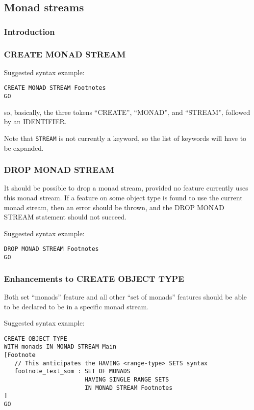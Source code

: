 \documentclass[a4paper,12pt]{article}
\begin{document}
\subsection{Monad streams}\label{sec:MonadStreams}

\subsubsection{Introduction}

\subsubsection{CREATE MONAD STREAM}

Suggested syntax example:

\begin{verbatim}
CREATE MONAD STREAM Footnotes
GO
\end{verbatim}

\noindent so, basically, the three tokens ``CREATE'', ``MONAD'', and
``STREAM'', followed by an IDENTIFIER.

Note that \texttt{STREAM} is not currently a keyword, so the list of
keywords will have to be expanded.

\subsubsection{DROP MONAD STREAM}

It should be possible to drop a monad stream, provided no feature
currently uses this monad stream.  If a feature on some object type is
found to use the current monad stream, then an error should be thrown,
and the DROP MONAD STREAM statement should not succeed.

Suggested syntax example:

\begin{verbatim}
DROP MONAD STREAM Footnotes
GO
\end{verbatim}

\subsubsection{Enhancements to CREATE OBJECT TYPE}

Both set ``monads'' feature and all other ``set of monads'' features should be able to be declared to be in a specific monad stream.

Suggested syntax example:

\begin{verbatim}
CREATE OBJECT TYPE
WITH monads IN MONAD STREAM Main
[Footnote
   // This anticipates the HAVING <range-type> SETS syntax
   footnote_text_som : SET OF MONADS 
                       HAVING SINGLE RANGE SETS 
                       IN MONAD STREAM Footnotes
]
GO
\end{verbatim}
\end{document}
